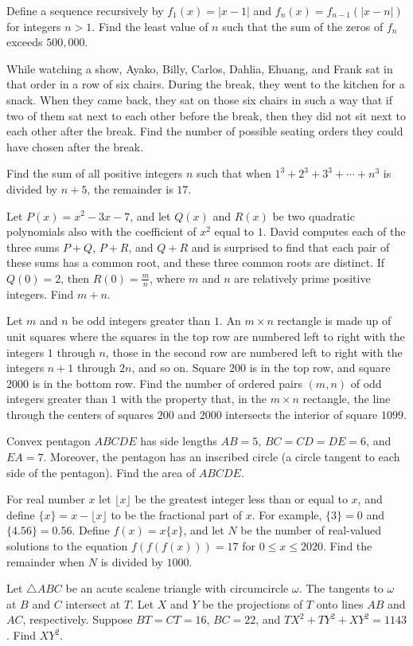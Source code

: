 \documentclass{article}%
\begin{document}
Define a sequence recursively by $f_1(x)=|x-1|$ and $f_n(x)=f_{n-1}(|x-n|)$ for integers $n>1$. Find the least value of $n$ such that the sum of the zeros of $f_n$ exceeds $500,000$.

While watching a show, Ayako, Billy, Carlos, Dahlia, Ehuang, and Frank sat in that order in a row of six chairs. During the break, they went to the kitchen for a snack. When they came back, they sat on those six chairs in such a way that if two of them sat next to each other before the break, then they did not sit next to each other after the break. Find the number of possible seating orders they could have chosen after the break.

Find the sum of all positive integers $n$ such that when $1^3+2^3+3^3+\cdots +n^3$ is divided by $n+5$, the remainder is $17$.

Let $P(x) = x^2 - 3x - 7$, and let $Q(x)$ and $R(x)$ be two quadratic polynomials also with the coefficient of $x^2$ equal to $1$. David computes each of the three sums $P + Q$, $P + R$, and $Q + R$ and is surprised to find that each pair of these sums has a common root, and these three common roots are distinct. If $Q(0) = 2$, then $R(0) = \frac{m}{n}$, where $m$ and $n$ are relatively prime positive integers. Find $m + n$.

Let $m$ and $n$ be odd integers greater than $1.$ An $m\times n$ rectangle is made up of unit squares where the squares in the top row are numbered left to right with the integers $1$ through $n$, those in the second row are numbered left to right with the integers $n + 1$ through $2n$, and so on. Square $200$ is in the top row, and square $2000$ is in the bottom row. Find the number of ordered pairs $(m,n)$ of odd integers greater than $1$ with the property that, in the $m\times n$ rectangle, the line through the centers of squares $200$ and $2000$ intersects the interior of square $1099$.

Convex pentagon $ABCDE$ has side lengths $AB=5$, $BC=CD=DE=6$, and $EA=7$. Moreover, the pentagon has an inscribed circle (a circle tangent to each side of the pentagon). Find the area of $ABCDE$.

For real number $x$ let $\lfloor x\rfloor$ be the greatest integer less than or equal to $x$, and define $\{x\} = x - \lfloor x \rfloor$ to be the fractional part of $x$. For example, $\{3\} = 0$ and $\{4.56\} = 0.56$. Define $f(x)=x\{x\}$, and let $N$ be the number of real-valued solutions to the equation $f(f(f(x)))=17$ for $0\leq x\leq 2020$. Find the remainder when $N$ is divided by $1000$.

Let $\triangle ABC$ be an acute scalene triangle with circumcircle $\omega$. The tangents to $\omega$ at $B$ and $C$ intersect at $T$. Let $X$ and $Y$ be the projections of $T$ onto lines $AB$ and $AC$, respectively. Suppose $BT = CT = 16$, $BC = 22$, and $TX^2 + TY^2 + XY^2 = 1143$. Find $XY^2$.

%
\end{document}
